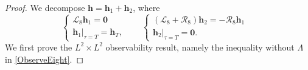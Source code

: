 \documentclass[12pt]{amsart}
\theoremstyle{remark}
\theoremstyle{definition}
\numberwithin{equation}{section}
\newcommand{\mL}{\mathcal{L}}
\newcommand{\mR}{\mathcal{R}}
\begin{document}
\begin{proof}
We decompose $\mathbf{h} = \mathbf{h}_1+ \mathbf{h}_2$, where
\begin{equation} \label{mLBackwardEightCauchy}
\left\{
\begin{array}{lr}
\mL_8 \mathbf{h}_1 = \mathbf{0} &  \\
\mathbf{h}_1|_{\tau=T} = \mathbf{h}_T,&
\end{array}
\right. \quad
\left\{
\begin{array}{lr}
(\mL_8 + \mR_8)\mathbf{h}_2 = -\mR_8 \mathbf{h}_1 &  \\
\mathbf{h}_2|_{\tau=T} = \mathbf{0}.&
\end{array}
\right.
\end{equation}
We first prove the $L^2\times L^2$ observability result, namely the inequality without $\Lambda$ in \eqref{ObserveEight}. 


\end{proof}
\end{document}
